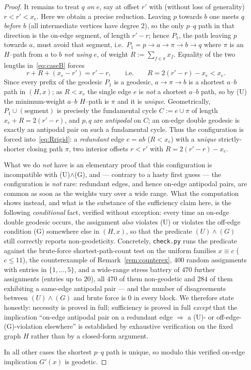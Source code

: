 \documentclass{amsart}
\theoremstyle{definition}
\begin{document}
\begin{proof}
It remains to treat $q$ \emph{on} $e$, say at offset $r'$ with (without loss of
generality) $r<r'<x_e$. Here we obtain a precise reduction. Leaving $p$ towards
$b$ one meets $q$ \emph{before} $b$ (all intermediate vertices have degree $2$),
so the only $p$--$q$ path in that direction is the on-edge segment, of length
$r'-r$; hence $P_1$, the path leaving $p$ towards $a$, must avoid that segment,
i.e.\ $P_1=p\to a\to\pi\to b\to q$ where $\pi$ is an $H$--path from $a$ to $b$
\emph{not using} $e$, of weight $R:=\sum_{f\in\pi}x_f$. Equality of the two
lengths in~\eqref{eq:caseB} forces
\begin{equation}\label{eq:Rrigid}
 r+R+(x_e-r')=r'-r,\qquad\text{i.e.}\qquad R=2(r'-r)-x_e<x_e .
\end{equation}
Since every prefix of the geodesic $P_1$ is a geodesic, $a\to\pi\to b$ is a
shortest $a$--$b$ path in $(H,x)$; as $R<x_e$ the single edge $e$ is \emph{not} a
shortest $a$--$b$ path, so by (U) the minimum-weight $a$--$b$ $H$--path is $\pi$
and it is \emph{unique}. Geometrically, $P_1\cup(\text{segment})$ is precisely
the fundamental cycle $C:=e\cup\pi$ of length $x_e+R=2(r'-r)$, and $p,q$ are
\emph{antipodal} on $C$; an on-edge double geodesic is exactly an antipodal pair
on such a fundamental cycle. Thus the configuration is forced
into~\eqref{eq:Rrigid}: a \emph{redundant} edge $e=ab$ ($R<x_e$) with a
\emph{unique} strictly-shorter closing path $\pi$, two interior offsets $r<r'$
with $R=2(r'-r)-x_e$.

What we do \emph{not} have is an elementary proof that this configuration is
incompatible with (U)$\wedge$(G), and --- contrary to a hasty first guess --- the
configuration is \emph{not} rare: redundant edges, and hence on-edge antipodal
pairs, are common as soon as the weights vary over a wide range. What the
computation shows instead, and what is the substance of the sufficiency claim
here, is the following \emph{conditional} fact, verified without exception: every
time an on-edge double geodesic occurs, the assignment \emph{also} violates (U)
or violates the off-edge condition (G) somewhere else in $(H,x)$, so that the
predicate $(U)\wedge(G)$ still correctly reports non-geodeticity. Concretely,
\texttt{check.py} runs the predicate against the brute-force shortest-path-count
test on the uniform families $x\equiv c$ ($c\le 11$), the counterexample of
Remark~\ref{rem:counterex}, $400$ random assignments with entries in
$\{1,\dots,5\}$, and a wide-range stress battery of $470$ further assignments
(entries up to $20$), all $470$ of them non-geodetic and $284$ of them exhibiting
a same-edge antipodal pair --- and the number of disagreements between
$(U)\wedge(G)$ and brute force is $0$ in every block. We
therefore state honestly: necessity is proved in full; sufficiency is proved in
full \emph{except} that the implication ``on-edge antipodal pair on a redundant
edge $\Rightarrow$ a (U)- or off-edge-(G)-violation elsewhere'' is established by
exhaustive verification on the fixed graph $H$ rather than by a closed-form
argument.

In all other cases the shortest $p$--$q$ path is unique, so modulo this verified
on-edge implication $G'(x)$ is geodetic.
\end{proof}
\end{document}
